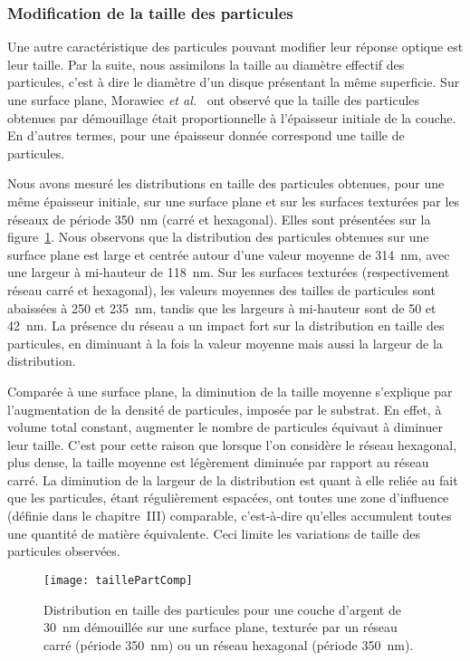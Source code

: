 \subsubsection{Modification de la taille des particules}
Une autre caractéristique des particules pouvant modifier leur réponse optique est leur taille. Par la suite, nous assimilons la \og taille \fg{} au diamètre effectif des particules, c'est à dire le diamètre d'un disque présentant la même superficie. Sur une surface plane, Morawiec \textit{et al.}~\cite{morawiec2013self} ont observé que la taille des particules obtenues par démouillage était proportionnelle à l'épaisseur initiale de la couche. En d'autres termes, pour une épaisseur donnée correspond une taille de particules.\par 
Nous avons mesuré les distributions en taille des particules obtenues, pour une même épaisseur initiale, sur une surface plane et sur les surfaces texturées par les réseaux de période 350~nm (carré et hexagonal). Elles sont présentées sur la figure~\ref{taillePartComp}. Nous observons que la distribution des particules obtenues sur une surface plane est large et centrée autour d'une valeur moyenne de 314~nm, avec une largeur à mi-hauteur de 118~nm. Sur les surfaces texturées (respectivement réseau carré et hexagonal), les valeurs moyennes des tailles de particules sont abaissées à 250 et 235~nm, tandis que les largeurs à mi-hauteur sont de 50 et 42~nm. La présence du réseau a un impact fort sur la distribution en taille des particules, en diminuant à la fois la valeur moyenne mais aussi la largeur de la distribution.\par 
Comparée à une surface plane, la diminution de la taille moyenne s'explique par l'augmentation de la densité de particules, imposée par le substrat. En effet, à volume total constant, augmenter le nombre de particules équivaut à diminuer leur taille. C'est pour cette raison que lorsque l'on considère le réseau hexagonal, plus dense, la taille moyenne est légèrement diminuée par rapport au réseau carré. La diminution de la largeur de la distribution est quant à elle reliée au fait que les particules, étant régulièrement espacées, ont toutes une zone d'influence (définie dans le chapitre~III) comparable, c'est-à-dire qu'elles accumulent toutes une quantité de matière équivalente. Ceci limite les variations de taille des particules observées. \par 
\begin{figure}[!htb]
\centering
\texttt{[image: taillePartComp]}
\caption{Distribution en taille des particules pour une couche d'argent de 30~nm démouillée sur une surface plane, texturée par un réseau carré (période 350~nm) ou un réseau hexagonal (période 350~nm).}
\label{taillePartComp}
\end{figure}

